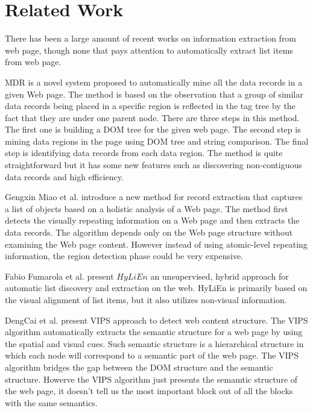 \section{Related Work}

There has been a large amount of recent works on information extraction from web page, though none that pays attention to automatically extract list items from web page.

MDR \cite{LiuGZ03:MDR} is a novel system proposed to automatically mine all the data records in a given Web page. The method is based on the observation that a group of similar data records being placed in a specific region is reflected in the tag tree by the fact that they are under one parent node. There are three steps in this method. The first one is building a DOM tree for the given web page. The second step is mining data regions in the page using DOM tree and string comparison. The final step is identifying data records from each data region. The method is quite straightforward but it  has some new features such as discovering non-contiguous data records and high efficiency.

Gengxin Miao et al. \cite{MiaoTHSM09:TagPathClustering} introduce a new method for record extraction that captures a list of objects based on a holistic analysis of a Web page. The method first detects the visually repeating information on a Web page and then extracts the data records. The algorithm depends only on the Web page structure without examining the Web page content. However instead of using atomic-level repeating information, the region detection phase could be very expensive.

Fabio Fumarola et al. \cite{FumarolaWBMH11:HyLiEn} present $HyLiEn$ an unsupervised, hybrid approach for automatic list discovery and extraction on the web. HyLiEn is primarily based on the visual alignment of list items, but it also utilizes non-visual information. 

DengCai et al. \cite{CYWM03a:VIPS} present VIPS approach to detect web content structure. The VIPS algorithm automatically extracts the semantic structure for a web page by using the spatial and visual cues. Such semantic structure is a hierarchical structure in which each node will correspond to a semantic part of the web page. The VIPS algorithm bridges the gap between the DOM structure and the semantic structure. Howerve the VIPS algorithm just presents the semamtic structure of the web page, it doesn't tell us the most important block out of all the blocks with the same semantics.

